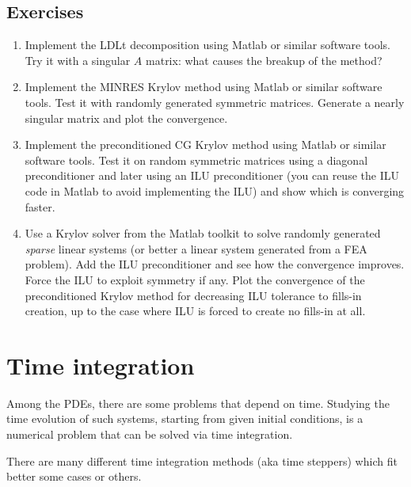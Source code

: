 \documentclass{digitaldynamics}
\begin{document}
\subsection{Exercises}

{
\small

\begin{enumerate}
	
	\item Implement the LDLt decomposition using Matlab or similar software tools. Try it with a singular $A$ matrix: what causes the breakup of the method? 
	
	\item Implement the MINRES Krylov method using Matlab or similar software tools. Test it with randomly generated symmetric matrices. Generate a nearly singular matrix and plot the convergence. 
	
	\item Implement the preconditioned CG Krylov method using Matlab or similar software tools. Test it on random symmetric matrices using a diagonal preconditioner and later using an ILU preconditioner (you can reuse the ILU code in Matlab to avoid implementing the ILU) and show which is converging faster.
	
	\item Use a Krylov solver from the Matlab toolkit to solve randomly generated \textit{sparse} linear systems (or better a linear system generated from a FEA problem). Add the ILU preconditioner and see how the convergence improves. Force the ILU to exploit symmetry if any. Plot the convergence of the preconditioned Krylov method for decreasing ILU tolerance to fills-in creation, up to the case where ILU is forced to create no fills-in at all.
	
	
\end{enumerate}

}



\newpage
\section{Time integration}

Among the PDEs, there are some problems that depend on time. Studying the time evolution of such systems, starting from given 
initial conditions, is a numerical problem that can be solved via time integration. 

There are many different time integration 
methods (aka time steppers) which fit better some cases or others. 
\end{document}
